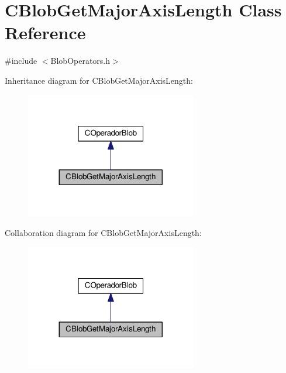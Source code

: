 \hypertarget{classCBlobGetMajorAxisLength}{\section{C\-Blob\-Get\-Major\-Axis\-Length Class Reference}
\label{classCBlobGetMajorAxisLength}
}


{\ttfamily \#include $<$Blob\-Operators.\-h$>$}



Inheritance diagram for C\-Blob\-Get\-Major\-Axis\-Length\-:\nopagebreak
\begin{figure}[H]
\begin{center}
\leavevmode
\includegraphics[width=212pt]{classCBlobGetMajorAxisLength__inherit__graph}
\end{center}
\end{figure}


Collaboration diagram for C\-Blob\-Get\-Major\-Axis\-Length\-:\nopagebreak
\begin{figure}[H]
\begin{center}
\leavevmode
\includegraphics[width=212pt]{classCBlobGetMajorAxisLength__coll__graph}
\end{center}
\end{figure}
